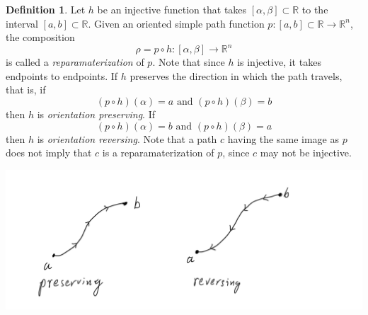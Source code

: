 \documentclass{article}
\theoremstyle{remark}
\theoremstyle{definition}
\newtheorem{definition}{Definition}[section]
\begin{document}
\begin{definition}
Let $h$ be an injective function that takes $[\alpha,\beta] \subset \mathbb{R}$ to the interval $[a, b] \subset \mathbb{R}$. Given an oriented simple path function $p: [a,b]\subset \mathbb{R} \longrightarrow \mathbb{R}^n$, the composition
\[\rho = p \circ h: [\alpha, \beta] \longrightarrow \mathbb{R}^n\]
is called a \textit{reparamaterization} of $p$. Note that since $h$ is injective, it takes endpoints to endpoints. If $h$ preserves the direction in which the path travels, that is, if 
\[(p \circ h)(\alpha) = a \text{ and } (p \circ h)(\beta) = b\]
then $h$ is \textit{orientation preserving}. If
\[(p \circ h)(\alpha) = b \text{ and } (p \circ h)(\beta) = a\]
then $h$ is \textit{orientation reversing}. Note that a path $c$ having the same image as $p$ does not imply that $c$ is a reparamaterization of $p$, since $c$ may not be injective. 
\begin{center}
    \includegraphics[scale=0.25]{img/Orientation_Preserving_Reversing.PNG}
\end{center}
\end{definition}
\end{document}
